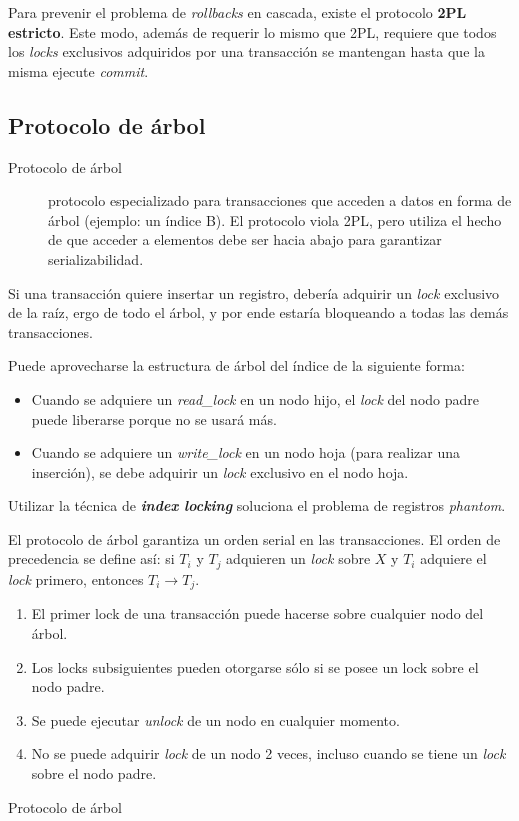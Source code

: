 \documentclass[a4paper, twoside]{article}
\begin{document}
Para prevenir el problema de \emph{rollbacks} en cascada, existe el protocolo \textbf{2PL estricto}. Este modo, además de requerir lo mismo que 2PL, requiere que todos los \emph{locks} exclusivos adquiridos por una transacción se mantengan hasta que la misma ejecute \emph{commit}.

\subsection{Protocolo de árbol}
\begin{description}
	\item[Protocolo de árbol] protocolo especializado para transacciones que acceden a datos en forma de árbol (ejemplo: un índice B). El protocolo viola 2PL, pero utiliza el hecho de que acceder a elementos debe ser hacia abajo para garantizar serializabilidad.
\end{description}

Si una transacción quiere insertar un registro, debería adquirir un \emph{lock} exclusivo de la raíz, ergo de todo el árbol, y por ende estaría bloqueando a todas las demás transacciones.

Puede aprovecharse la estructura de árbol del índice de la siguiente forma:
\begin{itemize}
	\item Cuando se adquiere un \emph{read\_lock} en un nodo hijo, el \emph{lock} del nodo padre puede liberarse porque no se usará más.
	\item Cuando se adquiere un \emph{write\_lock} en un nodo hoja (para realizar una inserción), se debe adquirir un \emph{lock }exclusivo en el nodo hoja.
\end{itemize}

Utilizar la técnica de \textbf{\emph{index locking}} soluciona el problema de registros \emph{phantom}.

El protocolo de árbol garantiza un orden serial en las transacciones. El orden de precedencia se define así: si $T_{i}$ y $T_{j}$ adquieren un \emph{lock} sobre $X$ y $T_{i}$ adquiere el \emph{lock} primero, entonces $T_{i} \to T_{j}$.

\begin{algorithm}[H]
	\begin{enumerate}
		\item El primer lock de una transacción puede hacerse sobre cualquier nodo del árbol.
		\item Los locks subsiguientes pueden otorgarse sólo si se posee un lock sobre el nodo padre.
		\item Se puede ejecutar \emph{unlock} de un nodo en cualquier momento.
		\item No se puede adquirir \emph{lock} de un nodo 2 veces, incluso cuando se tiene un \emph{lock }sobre el nodo padre.
\end{enumerate}
	\caption{Protocolo de árbol}
\end{algorithm}
\end{document}
